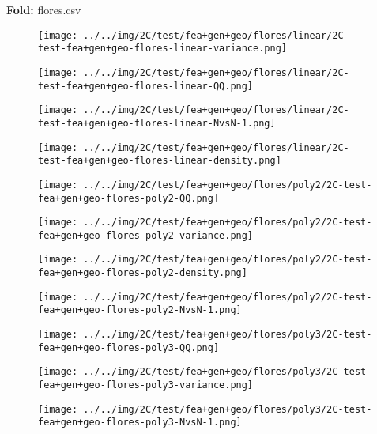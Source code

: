 \textbf{Fold:} flores.csv
\begin{figure}[H]
\centering	\texttt{[image: ../../img/2C/test/fea+gen+geo/flores/linear/2C-test-fea+gen+geo-flores-linear-variance.png]}
\end{figure}
\begin{figure}[H]
\centering	\texttt{[image: ../../img/2C/test/fea+gen+geo/flores/linear/2C-test-fea+gen+geo-flores-linear-QQ.png]}
\end{figure}
\begin{figure}[H]
\centering	\texttt{[image: ../../img/2C/test/fea+gen+geo/flores/linear/2C-test-fea+gen+geo-flores-linear-NvsN-1.png]}
\end{figure}
\begin{figure}[H]
\centering	\texttt{[image: ../../img/2C/test/fea+gen+geo/flores/linear/2C-test-fea+gen+geo-flores-linear-density.png]}
\end{figure}
\begin{figure}[H]
\centering	\texttt{[image: ../../img/2C/test/fea+gen+geo/flores/poly2/2C-test-fea+gen+geo-flores-poly2-QQ.png]}
\end{figure}
\begin{figure}[H]
\centering	\texttt{[image: ../../img/2C/test/fea+gen+geo/flores/poly2/2C-test-fea+gen+geo-flores-poly2-variance.png]}
\end{figure}
\begin{figure}[H]
\centering	\texttt{[image: ../../img/2C/test/fea+gen+geo/flores/poly2/2C-test-fea+gen+geo-flores-poly2-density.png]}
\end{figure}
\begin{figure}[H]
\centering	\texttt{[image: ../../img/2C/test/fea+gen+geo/flores/poly2/2C-test-fea+gen+geo-flores-poly2-NvsN-1.png]}
\end{figure}
\begin{figure}[H]
\centering	\texttt{[image: ../../img/2C/test/fea+gen+geo/flores/poly3/2C-test-fea+gen+geo-flores-poly3-QQ.png]}
\end{figure}
\begin{figure}[H]
\centering	\texttt{[image: ../../img/2C/test/fea+gen+geo/flores/poly3/2C-test-fea+gen+geo-flores-poly3-variance.png]}
\end{figure}
\begin{figure}[H]
\centering	\texttt{[image: ../../img/2C/test/fea+gen+geo/flores/poly3/2C-test-fea+gen+geo-flores-poly3-NvsN-1.png]}
\end{figure}
